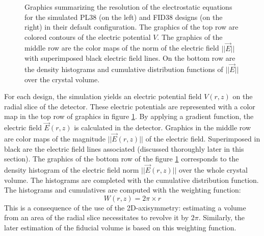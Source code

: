 \begin{figure}
\begin{minipage}{0.49\textwidth}
\end{minipage}
\caption{
Graphics summarizing the resolution of the electrostatic equations for the  simulated PL38 (on the left) and FID38 designs (on the right) in their default configuration. The graphics of the top row are colored contours of the electric potential $V$. The graphics of the middle row are the color maps of the norm of the  electric field $|| \vec{E} ||$  with superimposed black electric field lines. On the bottom row are the density histograms and cumulative distribution functions of $|| \vec{E} ||$ over the crystal volume.
}
\label{fig:pl38-fid38-steady-state}
\end{figure}

For each design, the simulation yields an electric potential field $V(r,z)$ on the radial slice of the detector. These electric potentials are represented with a color map in the top row of graphics in figure \ref{fig:pl38-fid38-steady-state}. 
By applying a gradient function, the electric field $\vec{E}(r,z)$ is calculated in the detector. Graphics in the middle row are color maps of the magnitude $||\vec{E}(r,z)||$ of the electric field. Superimposed in black are the electric field lines associated (discussed thoroughly later in this section).
The graphics of the bottom row of the figure \ref{fig:pl38-fid38-steady-state} corresponds to the density histogram of the electric field norm $||\vec{E}(r,z)||$ over the whole crystal volume. The histograms are completed with the cumulative distribution function. The histograms and cumulatives are computed with the weighting function:
\begin{equation}
\label{eq:rotation-weight}
W(r,z) = 2\pi \times r
\end{equation}
This is a consequence of the use of the 2D-axisymmetry: estimating a volume from an area of the radial slice necessitates to revolve it by $2\pi$. Similarly, the later estimation of the fiducial volume is based on this weighting function.

